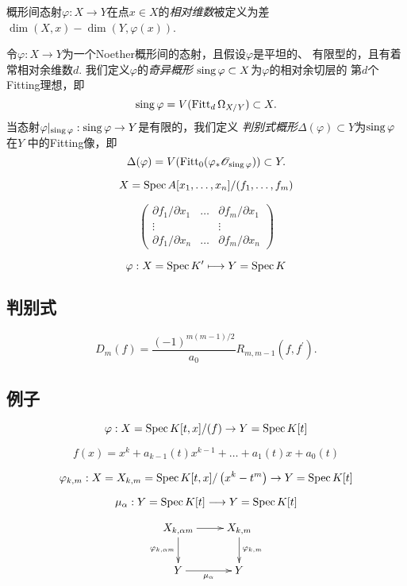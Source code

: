 概形间态射$\varphi:X\to Y$在点$x\in X$的\textit{相对维数}被定义为差
$\dim (X,x)-\dim(Y,\varphi(x))$.

\begin{defi}\label{defi:5.21}
    令$\varphi:X\to Y$为一个Noether概形间的态射，且假设$\varphi$是平坦的、
    有限型的，且有着常相对余维数$d$. 我们定义$\varphi$的\textit{奇异概形}
    $\operatorname{sing}\varphi\subset X$为$\varphi$的相对余切层的
    第$d$个Fitting理想，即
    \[
        \operatorname{sing}\varphi=V(\operatorname{Fitt}_d \Omega_{X/Y})\subset X.
    \]
    当态射$\varphi|_{\operatorname{sing} \varphi}:\operatorname{sing} \varphi\to Y$是有限的，我们定义
    \textit{判别式概形}$\Delta(\varphi)\subset Y$为$\operatorname{sing} \varphi$在$Y$
    中的Fitting像，即
    \[
        \Delta(\varphi)=V(\operatorname{Fitt}_0(\varphi_* \mathscr{O}_{\operatorname{sing} \varphi})) 
        \subset Y.
    \]
\end{defi}

\[
    X=\operatorname{Spec} A[x_1, \ldots, x_n] /(f_1, \ldots, f_m)
\]

\[
    \begin{pmatrix}
        \partial f_1 / \partial x_1 & \ldots & \partial f_m / \partial x_1 \\
        \vdots & & \vdots \\
        \partial f_1 / \partial x_n & \ldots & \partial f_m / \partial x_n
    \end{pmatrix}
\]

\[
    \varphi: X=\operatorname{Spec} K^{\prime} \longmapsto Y=\operatorname{Spec} K
\]

\subsection{判别式}

\[
    D_m(f)=\frac{(-1)^{m(m-1) / 2}}{a_0} R_{m, m-1}(f, f^{\prime}).
\]

\subsection{例子}

\[
    \varphi: X=\operatorname{Spec} K[t, x] /(f) \rightarrow Y=\operatorname{Spec} K[t]
\]

\[
    f(x)=x^k+a_{k-1}(t) x^{k-1}+\ldots+a_1(t) x+a_0(t)
\]

\[
    \varphi_{k, m}: X=X_{k, m}=\operatorname{Spec} K[t, x] /\left(x^k-t^m\right) \rightarrow Y=\operatorname{Spec} K[t]
\]

\[
    \mu_\alpha: Y=\operatorname{Spec} K[t] \longrightarrow Y=\operatorname{Spec} K[t]
\]

\[
    \xymatrix{
        X_{k,\alpha m}\ar[r]\ar[d]_{\varphi_{k,\alpha m}}& X_{k,m}\ar[d]^{\varphi_{k, m}}\\
        Y\ar[r]_{\mu_\alpha}& Y
    }
\]


